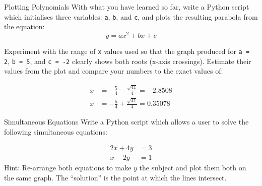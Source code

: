 \documentclass{lab}
\begin{document}
\begin{task}{Plotting Polynomials}{}
With what you have learned so far, write a Python script which initialises three variables: \texttt{a}, \texttt{b}, and \texttt{c}, and plots the resulting parabola from the equation:
\begin{equation}
y = ax^2 + bx + c
\end{equation}

Experiment with the range of \texttt{x} values used so that the graph produced for \texttt{a = 2}, \texttt{b = 5}, and \texttt{c = -2} clearly shows both roots (x-axis crossings). Estimate their values from the plot and compare your numbers to the exact values of:

\begin{align*}
x &= - \frac{5}{4} - \frac{\sqrt{41}}{4} = -2.8508\\
x &= - \frac{5}{4} + \frac{\sqrt{41}}{4} = 0.35078
\end{align*}
\end{task}

\begin{task}{Simultaneous Equations}{}
Write a Python script which allows a user to solve the following simultaneous equations:

\begin{align}
2x + 4y &= 3\\
x - 2y &= 1
\end{align}
Hint: Re-arrange both equations to make $y$ the subject and plot them both on the same graph. The ``solution'' is the point at which the lines intersect.
\end{task}
\end{document}
